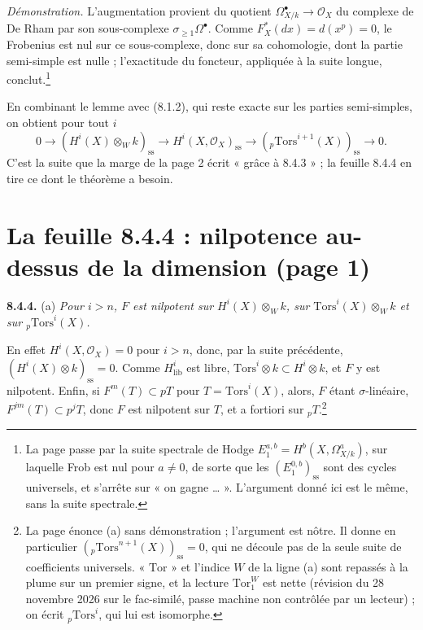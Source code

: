 \documentclass[11pt,a4paper]{article}
\begin{document}
\emph{Démonstration.} L'augmentation provient du quotient
$\Omega^{\bullet}_{X/k} \to \mathcal{O}_{X}$ du complexe de De Rham par son
sous-complexe $\sigma_{\geq 1}\Omega^{\bullet}$. Comme $F_{X}^{*}(dx) =
d(x^{p}) = 0$, le Frobenius est nul sur ce sous-complexe, donc sur sa
cohomologie, dont la partie semi-simple est nulle ; l'exactitude du foncteur,
appliquée à la suite longue, conclut.\footnote{La page passe par la suite
spectrale de Hodge $E_{1}^{a,b} = H^{b}(X, \Omega^{a}_{X/k})$, sur laquelle
Frob est nul pour $a \neq 0$, de sorte que les
$(E_{1}^{0,b})_{\mathrm{ss}}$ sont des cycles universels, et s'arrête sur
« on gagne \ldots{} ». L'argument donné ici est le même, sans la suite
spectrale.}

En combinant le lemme avec (8.1.2), qui reste exacte sur les parties
semi-simples, on obtient pour tout $i$
\[
0 \to (H^{i}(X) \otimes_{W} k)_{\mathrm{ss}} \to H^{i}(X,
\mathcal{O}_{X})_{\mathrm{ss}} \to ({}_{p}\mathrm{Tors}^{i+1}(X))_{\mathrm{ss}}
\to 0 .
\]
C'est la suite que la marge de la page 2 écrit « grâce à 8.4.3 » ; la
feuille 8.4.4 en tire ce dont le théorème a besoin.

\section*{La feuille 8.4.4 : nilpotence au-dessus de la dimension (page 1)}

\textbf{8.4.4.} (a) \emph{Pour $i > n$, $F$ est nilpotent sur
$H^{i}(X) \otimes_{W} k$, sur $\mathrm{Tors}^{i}(X) \otimes_{W} k$ et sur
${}_{p}\mathrm{Tors}^{i}(X)$.}

En effet $H^{i}(X, \mathcal{O}_{X}) = 0$ pour $i > n$, donc, par la suite
précédente, $(H^{i}(X) \otimes k)_{\mathrm{ss}} = 0$. Comme $H^{i}_{\mathrm{lib}}$
est libre, $\mathrm{Tors}^{i} \otimes k \subset H^{i} \otimes k$, et $F$ y est
nilpotent. Enfin, si $F^{m}(T) \subset pT$ pour $T = \mathrm{Tors}^{i}(X)$,
alors, $F$ étant $\sigma$-linéaire, $F^{jm}(T) \subset p^{j}T$, donc $F$ est
nilpotent sur $T$, et a fortiori sur ${}_{p}T$.\footnote{La page énonce (a)
sans démonstration ; l'argument est nôtre. Il donne en particulier
$({}_{p}\mathrm{Tors}^{n+1}(X))_{\mathrm{ss}} = 0$, qui ne découle pas
de la seule suite de coefficients universels. « $\mathrm{Tor}$ » et l'indice
$W$ de la ligne (a) sont repassés à la plume sur un premier signe, et la
lecture $\mathrm{Tor}^{W}_{1}$ est nette (révision du 28 novembre 2026 sur le
fac-similé, passe machine non contrôlée par un lecteur) ; on écrit
${}_{p}\mathrm{Tors}^{i}$, qui lui est isomorphe.}
\end{document}

